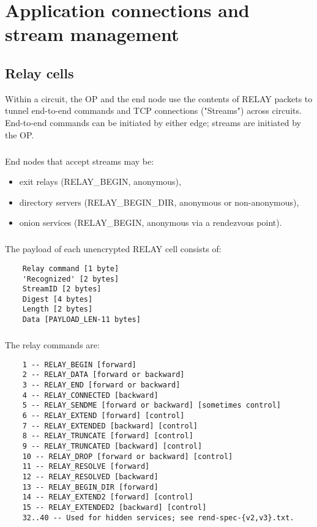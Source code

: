 \chapter{Application connections and stream management}

\section{Relay cells}

Within a circuit, the OP and the end node use the contents of
RELAY packets to tunnel end-to-end commands and TCP connections
("Streams") across circuits. End-to-end commands can be initiated
by either edge; streams are initiated by the OP.

\paragraph{}
End nodes that accept streams may be:
\begin{itemize}
    \item exit relays (RELAY\_BEGIN, anonymous),
    \item directory servers (RELAY\_BEGIN\_DIR, anonymous or non-anonymous),
    \item onion services (RELAY\_BEGIN, anonymous via a rendezvous point).
\end{itemize}

\paragraph{}
The payload of each unencrypted RELAY cell consists of:

\begin{verbatim}
    Relay command [1 byte]
    'Recognized' [2 bytes]
    StreamID [2 bytes]
    Digest [4 bytes]
    Length [2 bytes]
    Data [PAYLOAD_LEN-11 bytes]
\end{verbatim}

\paragraph{}
The relay commands are:

\begin{verbatim}
    1 -- RELAY_BEGIN [forward]
    2 -- RELAY_DATA [forward or backward]
    3 -- RELAY_END [forward or backward]
    4 -- RELAY_CONNECTED [backward]
    5 -- RELAY_SENDME [forward or backward] [sometimes control]
    6 -- RELAY_EXTEND [forward] [control]
    7 -- RELAY_EXTENDED [backward] [control]
    8 -- RELAY_TRUNCATE [forward] [control]
    9 -- RELAY_TRUNCATED [backward] [control]
    10 -- RELAY_DROP [forward or backward] [control]
    11 -- RELAY_RESOLVE [forward]
    12 -- RELAY_RESOLVED [backward]
    13 -- RELAY_BEGIN_DIR [forward]
    14 -- RELAY_EXTEND2 [forward] [control]
    15 -- RELAY_EXTENDED2 [backward] [control]
    32..40 -- Used for hidden services; see rend-spec-{v2,v3}.txt.
\end{verbatim}

